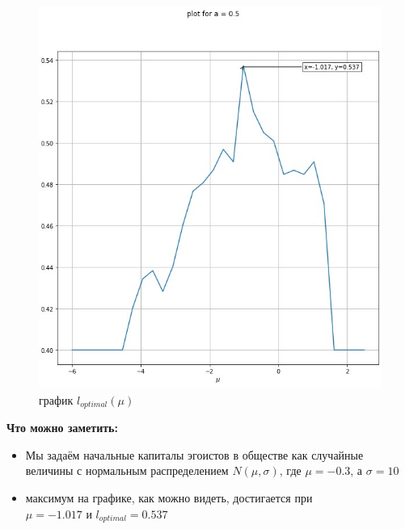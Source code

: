 \documentclass{article}
\begin{document}
\begin{figure}[H]
	\centering
	\includegraphics[width=0.7\linewidth]{assets/plot_mu_l_details.jpg}
	\caption{график $l_{optimal}(\mu)$}
	\label{fig:mpr}
\end{figure}
\begin{conclusion}
\textbf{Что можно заметить:}
\begin{itemize}
	\item Мы задаём начальные капиталы эгоистов в обществе как случайные величины с нормальным распределением $N\left(\mu, \sigma \right) $, где $\mu = -0.3$, а $\sigma = 10$
	\item максимум на графике, как можно видеть, достигается при \\ $\mu = -1.017$ и $l_{optimal} = 0.537$
\end{itemize}
\end{conclusion}
\null\newpage
\end{document}

